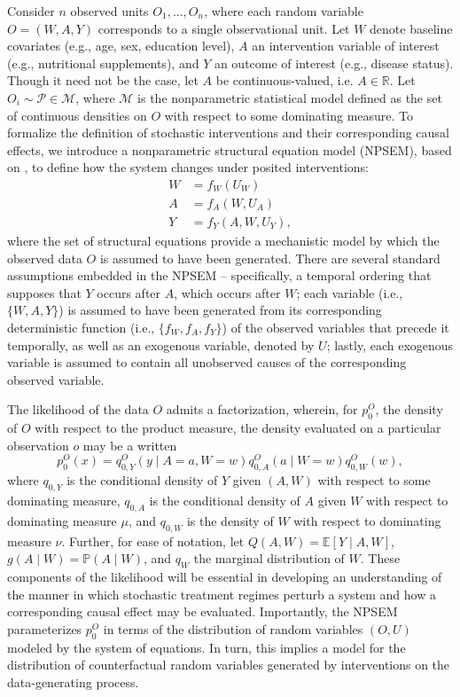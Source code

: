 \documentclass[12pt, krantz2,]{krantz}
\theoremstyle{definition}
\theoremstyle{definition}
\theoremstyle{definition}
\newcommand{\R}{\mathbb{R}}
\newcommand{\M}{\mathcal{M}}
\newcommand{\1}{\mathbbm{1}}
\begin{document}
Consider \(n\) observed units \(O_1, \ldots, O_n\), where each random variable \(O = (W, A, Y)\) corresponds to a single observational unit. Let \(W\) denote baseline
covariates (e.g., age, sex, education level), \(A\) an intervention variable of
interest (e.g., nutritional supplements), and \(Y\) an outcome of interest (e.g.,
disease status). Though it need not be the case, let \(A\) be continuous-valued,
i.e. \(A \in \R\). Let \(O_i \sim \mathcal{P} \in \M\), where \(\M\) is the
nonparametric statistical model defined as the set of continuous densities on
\(O\) with respect to some dominating measure. To formalize the definition of
stochastic interventions and their corresponding causal effects, we introduce a
nonparametric structural equation model (NPSEM), based on \citet{pearl2009causality},
to define how the system changes under posited interventions:
\begin{align}
  W &= f_W(U_W) \\ A &= f_A(W, U_A) \\ Y &= f_Y(A, W, U_Y),
  \label{eq:npsem-shift}
\end{align}
where the set of structural equations provide a mechanistic model by which the
observed data \(O\) is assumed to have been generated. There are several standard
assumptions embedded in the NPSEM -- specifically, a temporal ordering that
supposes that \(Y\) occurs after \(A\), which occurs after \(W\); each variable (i.e.,
\(\{W, A, Y\}\)) is assumed to have been generated from its corresponding
deterministic function (i.e., \(\{f_W, f_A, f_Y\}\)) of the observed variables
that precede it temporally, as well as an exogenous variable, denoted by \(U\);
lastly, each exogenous variable is assumed to contain all unobserved causes of
the corresponding observed variable.

The likelihood of the data \(O\) admits a factorization, wherein, for \(p_0^O\),
the density of \(O\) with respect to the product measure, the density evaluated
on a particular observation \(o\) may be a written
\begin{equation}
  p_0^O(x) = q^O_{0,Y}(y \mid A = a, W = w) q^O_{0,A}(a \mid W = w)
  q^O_{0,W}(w),
  \label{eq:likelihood-factorization-shift}
\end{equation}
where \(q_{0, Y}\) is the conditional density of \(Y\) given \((A, W)\) with respect
to some dominating measure, \(q_{0, A}\) is the conditional density of \(A\) given
\(W\) with respect to dominating measure \(\mu\), and \(q_{0, W}\) is the density of
\(W\) with respect to dominating measure \(\nu\). Further, for ease of notation, let
\(Q(A, W) = \mathbb{E}[Y \mid A, W]\), \(g(A \mid W) = \mathbb{P}(A \mid W)\), and
\(q_W\) the marginal distribution of \(W\). These components of the likelihood will
be essential in developing an understanding of the manner in which stochastic
treatment regimes perturb a system and how a corresponding causal effect may be
evaluated. Importantly, the NPSEM parameterizes \(p_0^O\) in terms of the
distribution of random variables \((O, U)\) modeled by the system of equations. In
turn, this implies a model for the distribution of counterfactual random
variables generated by interventions on the data-generating process.
\end{document}
